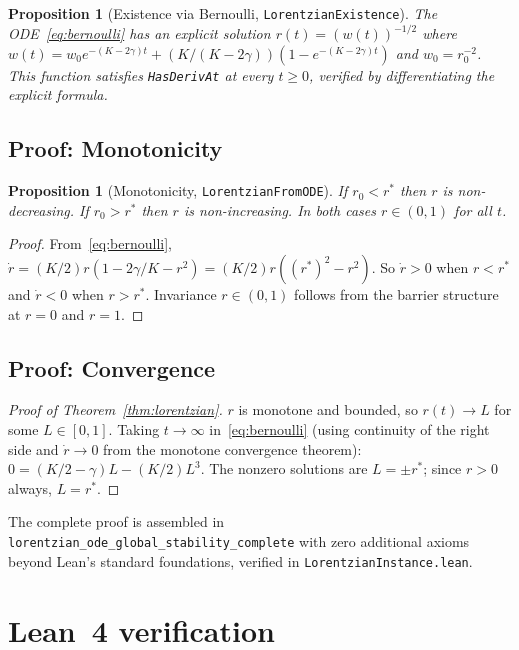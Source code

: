 \documentclass[11pt,a4paper]{article}
\newtheorem{proposition}[theorem]{Proposition}
\theoremstyle{definition}
\begin{document}
\begin{proposition}[Existence via Bernoulli, \texttt{LorentzianExistence}]\label{prop:bernoulli}
The ODE~\eqref{eq:bernoulli} has an explicit solution $r(t) = (w(t))^{-1/2}$ where $w(t) = w_0 e^{-(K-2\gamma)t} + (K/(K-2\gamma))(1 - e^{-(K-2\gamma)t})$ and $w_0 = r_0^{-2}$. This function satisfies \texttt{HasDerivAt} at every $t \geq 0$, verified by differentiating the explicit formula.
\end{proposition}

\subsection{Proof: Monotonicity}\label{sec:mono}

\begin{proposition}[Monotonicity, \texttt{LorentzianFromODE}]\label{prop:mono}
If $r_0 < r^*$ then $r$ is non-decreasing. If $r_0 > r^*$ then $r$ is non-increasing. In both cases $r \in (0,1)$ for all $t$.
\end{proposition}

\begin{proof}
From~\eqref{eq:bernoulli}, $\dot{r} = (K/2)r(1-2\gamma/K - r^2) = (K/2)r((r^*)^2 - r^2)$. So $\dot{r} > 0$ when $r < r^*$ and $\dot{r} < 0$ when $r > r^*$. Invariance $r \in (0,1)$ follows from the barrier structure at $r = 0$ and $r = 1$.
\end{proof}

\subsection{Proof: Convergence}

\begin{proof}[Proof of Theorem~\ref{thm:lorentzian}]
$r$ is monotone and bounded, so $r(t) \to L$ for some $L \in [0,1]$. Taking $t \to \infty$ in~\eqref{eq:bernoulli} (using continuity of the right side and $\dot{r} \to 0$ from the monotone convergence theorem): $0 = (K/2 - \gamma)L - (K/2)L^3$. The nonzero solutions are $L = \pm r^*$; since $r > 0$ always, $L = r^*$.
\end{proof}

The complete proof is assembled in \texttt{lorentzian\_ode\_global\_stability\_complete} with zero additional axioms beyond Lean's standard foundations, verified in \texttt{LorentzianInstance.lean}.

\section{Lean~4 verification}\label{sec:lean}
\end{document}
